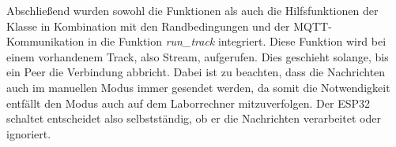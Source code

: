 Abschließend wurden sowohl die Funktionen als auch die Hilfsfunktionen der Klasse in Kombination mit den Randbedingungen und der MQTT-Kommunikation in die Funktion \textit{run\_track} integriert. Diese Funktion wird bei einem vorhandenem Track, also Stream, aufgerufen. Dies geschieht solange, bis ein Peer die Verbindung abbricht. Dabei ist zu beachten, dass die Nachrichten auch im manuellen Modus immer gesendet werden, da somit die Notwendigkeit entfällt den Modus auch auf dem Laborrechner mitzuverfolgen. Der ESP32 schaltet entscheidet also selbstständig, ob er die Nachrichten verarbeitet oder ignoriert. 